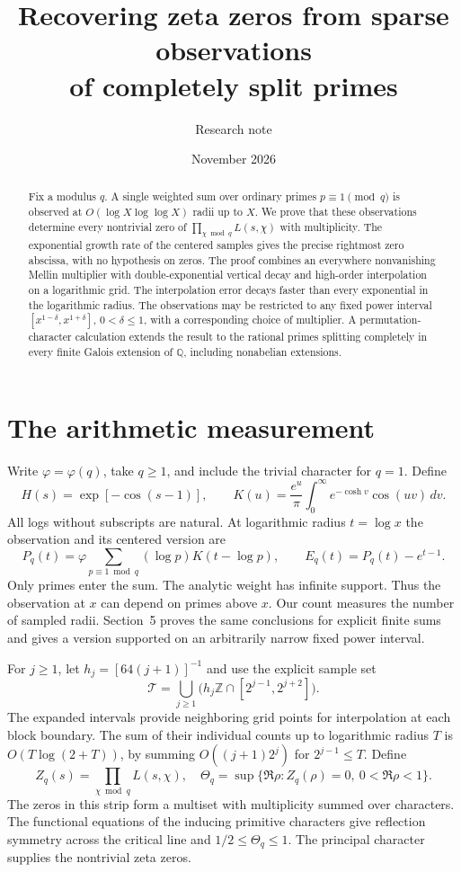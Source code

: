 \documentclass[11pt]{article}
\title{Recovering zeta zeros from sparse observations\\ of completely split primes}
\author{Research note}
\date{November 2026}
\begin{document}
\maketitle
\begin{abstract}
Fix a modulus $q$. A single weighted sum over ordinary primes $p\equiv1\pmod q$ is observed at $O(\log X\log\log X)$ radii up to $X$. We prove that these observations determine every nontrivial zero of $\prod_{\chi\bmod q}L(s,\chi)$ with multiplicity. The exponential growth rate of the centered samples gives the precise rightmost zero abscissa, with no hypothesis on zeros. The proof combines an everywhere nonvanishing Mellin multiplier with double-exponential vertical decay and high-order interpolation on a logarithmic grid. The interpolation error decays faster than every exponential in the logarithmic radius. The observations may be restricted to any fixed power interval $[x^{1-\delta},x^{1+\delta}]$, $0<\delta\le1$, with a corresponding choice of multiplier. A permutation-character calculation extends the result to the rational primes splitting completely in every finite Galois extension of $\mathbb Q$, including nonabelian extensions.
\end{abstract}

\section{The arithmetic measurement}

Write $\varphi=\varphi(q)$, take $q\ge1$, and include the trivial character for $q=1$. Define
\[
 H(s)=\exp[-\cos(s-1)],\qquad
 K(u)=\frac{e^u}{\pi}\int_0^\infty e^{-\cosh v}\cos(uv)\,dv .
\]
All logs without subscripts are natural. At logarithmic radius $t=\log x$ the observation and its centered version are
\begin{equation}\label{eq:obs}
 P_q(t)=\varphi\sum_{p\equiv1\bmod q}(\log p)K(t-\log p),
 \qquad E_q(t)=P_q(t)-e^{t-1}.
\end{equation}
Only primes enter the sum. The analytic weight has infinite support. Thus the observation at $x$ can depend on primes above $x$. Our count measures the number of sampled radii. Section~5 proves the same conclusions for explicit finite sums and gives a version supported on an arbitrarily narrow fixed power interval.

For $j\ge1$, let $h_j=[64(j+1)]^{-1}$ and use the explicit sample set
\begin{equation}\label{eq:grid}
 \mathcal T=\bigcup_{j\ge1}\bigl(h_j\mathbb Z\cap[2^{j-1},2^{j+2}]\bigr).
\end{equation}
The expanded intervals provide neighboring grid points for interpolation at each block boundary. The sum of their individual counts up to logarithmic radius $T$ is $O(T\log(2+T))$, by summing $O((j+1)2^j)$ for $2^{j-1}\le T$. Define
\[
 Z_q(s)=\prod_{\chi\bmod q}L(s,\chi),\quad
 \Theta_q=\sup\{\Re\rho:Z_q(\rho)=0,\ 0<\Re\rho<1\}.
\]
The zeros in this strip form a multiset with multiplicity summed over characters. The functional equations of the inducing primitive characters give reflection symmetry across the critical line and $1/2\le\Theta_q\le1$. The principal character supplies the nontrivial zeta zeros.
\end{document}
